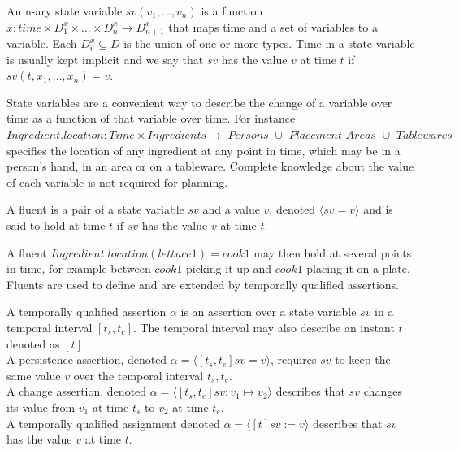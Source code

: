 \begin{definition}
  An n-ary state variable $sv(v_1,...,v_n)$ is a function $x: time \times D_1^x \times \dots \times D_n^x \rightarrow D_{n+1}^x$ that maps time and a set of variables to a variable.
  Each $D_i^x \subseteq D$ is the union of one or more types.
  Time in a state variable is usually kept implicit and we say that $sv$ has the value $v$ at time $t$ if $sv(t,x_1,...,x_n) = v$.
\end{definition}

State variables are a convenient way to describe the change of a variable over time as a function of that variable over time.
For instance $Ingredient.location: Time \times \textit{Ingredients} \rightarrow \textit{ Persons } \cup \textit{ Placement Areas } \cup \textit{ Tablewares }$ specifies the location of any ingredient at any point in time, which may be in a person's hand, in an area or on a tableware.
Complete knowledge about the value of each variable is not required for planning.

\begin{definition}[Fluent]
  A fluent is a pair of a state variable $sv$ and a value $v$, denoted $\langle sv=v \rangle$ and is said to hold at time $t$ if $sv$ has the value $v$ at time $t$.
\end{definition}

A fluent $Ingredient.location(lettuce1) = cook1$ may then hold at several points in time, for example between $cook1$ picking it up and $cook1$ placing it on a plate.
Fluents are used to define and are extended by temporally qualified assertions.

\begin{definition}
  A temporally qualified assertion $\alpha$ is an assertion over a state variable $sv$ in a temporal interval $[t_s,t_e]$.
  The temporal interval may also describe an instant $t$ denoted as $[t]$.\\
  A persistence assertion, denoted $\alpha = \langle [t_s,t_e] sv=v \rangle$, requires $sv$ to keep the same value $v$ over the temporal interval $t_s,t_e$.\\
  A change assertion, denoted $\alpha = \langle [t_s,t_e] sv : v_1 \mapsto v_2 \rangle$ describes that $sv$ changes its value from $v_1$ at time $t_s$ to $v_2$ at time $t_e$. \\
  A temporally qualified assignment denoted $\alpha = \langle [t] sv := v \rangle$ describes that $sv$ has the value $v$ at time $t$.
\end{definition}

